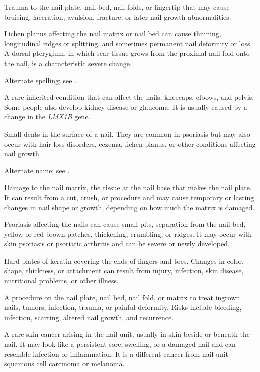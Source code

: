  Trauma to the nail plate, nail bed, nail folds, or fingertip that may cause bruising, laceration, avulsion, fracture, or later nail-growth abnormalities.

 Lichen planus affecting the nail matrix or nail bed can cause thinning, longitudinal
ridges or splitting, and sometimes permanent nail deformity or loss. A dorsal pterygium,
in which scar tissue grows from the proximal nail fold onto the nail, is a characteristic
severe change.

 Alternate spelling; see .

 A rare inherited condition that can affect the nails, kneecaps, elbows, and pelvis. Some people also develop kidney disease or glaucoma. It is usually caused by a change in the \textit{LMX1B} gene.

 Small dents in the surface of a nail. They are common in psoriasis but may also occur with hair-loss disorders, eczema, lichen planus, or other conditions affecting nail growth.

 Alternate name; see .

 Damage to the nail matrix, the tissue at
  the nail base that makes the nail plate. It can result from a cut,
  crush, or procedure and may cause temporary or lasting changes in nail
  shape or growth, depending on how much the matrix is damaged.

 Psoriasis affecting the nails can cause small pits, separation from the nail bed, yellow or red-brown patches, thickening, crumbling, or ridges. It may occur with skin psoriasis or psoriatic arthritis and can be severe or newly developed.

 Hard plates of keratin covering the ends of fingers and toes. Changes in color, shape, thickness, or attachment can result from injury, infection, skin disease, nutritional problems, or other illness.

 A procedure on the nail plate, nail bed, nail fold, or matrix to treat ingrown nails, tumors, infection, trauma, or painful deformity. Risks include bleeding, infection, scarring, altered nail growth, and recurrence.

 A rare skin cancer arising in
  the nail unit, usually in skin beside or beneath the nail. It may look
  like a persistent sore, swelling, or a damaged nail and can resemble
  infection or inflammation. It is a different cancer from nail-unit
  squamous cell carcinoma or melanoma.

